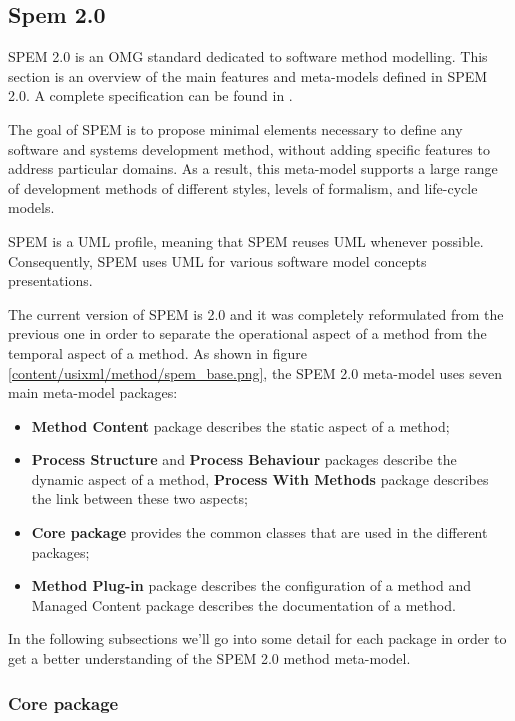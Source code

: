 \subsection{Spem 2.0}
\label{subsection:spem2}

SPEM 2.0 is an OMG standard dedicated to software method modelling. This section is an overview of the main features and meta-models defined in SPEM 2.0. A complete specification can be found in \cite{omgspem2}.

The goal of SPEM is to propose minimal elements necessary to define any software and systems development method, without adding specific features to address particular domains. As a result, this meta-model supports a large range of development methods of different styles, levels of formalism, and life-cycle models.

SPEM is a UML profile, meaning that SPEM reuses UML whenever possible. Consequently, SPEM uses UML for various software model concepts presentations.

The current version of SPEM is 2.0 and it was completely reformulated from the previous one in order to separate the operational aspect of a method from the temporal aspect of a method. As shown in figure \ref{content/usixml/method/spem_base.png}, the SPEM 2.0 meta-model uses seven main meta-model packages:
\begin{itemize}
\item \textbf{Method Content} package describes the static aspect of a method; 
\item \textbf{Process Structure} and \textbf{Process Behaviour} packages describe the dynamic aspect of a method, \textbf{Process With Methods} package describes the link between these two aspects; 
\item \textbf{Core package} provides the common classes that are used in the different packages; \item \textbf{Method Plug-in} package describes the configuration of a method and Managed Content package describes the documentation of a method.
\end{itemize}


In the following subsections we'll go into some detail for each package in order to get a better understanding of the SPEM 2.0 method meta-model.

\subsubsection{Core package}

